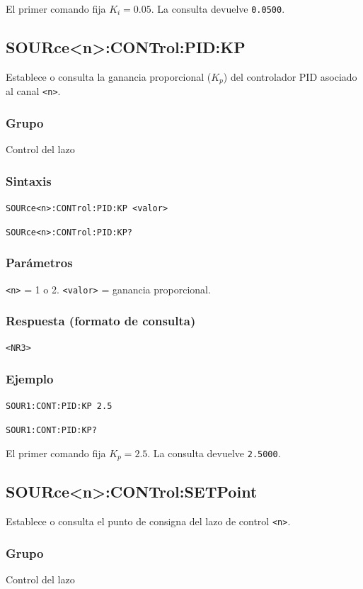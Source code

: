 El primer comando fija $K_i = 0.05$. La consulta devuelve \texttt{0.0500}.

\subsection*{SOURce<n>:CONTrol:PID:KP}

Establece o consulta la ganancia proporcional ($K_p$) del controlador PID
asociado al canal \texttt{<n>}.

\subsubsection*{Grupo}
Control del lazo

\subsubsection*{Sintaxis}
\texttt{SOURce<n>:CONTrol:PID:KP <valor>}\par
\texttt{SOURce<n>:CONTrol:PID:KP?}

\subsubsection*{Parámetros}
\texttt{<n>} = 1 o 2. \texttt{<valor>} = ganancia proporcional.

\subsubsection*{Respuesta (formato de consulta)}
\texttt{<NR3>}

\subsubsection*{Ejemplo}
\texttt{SOUR1:CONT:PID:KP 2.5}\par
\texttt{SOUR1:CONT:PID:KP?}

El primer comando fija $K_p = 2.5$. La consulta devuelve \texttt{2.5000}.

\subsection*{SOURce<n>:CONTrol:SETPoint}

Establece o consulta el punto de consigna del lazo de control \texttt{<n>}.

\subsubsection*{Grupo}
Control del lazo

